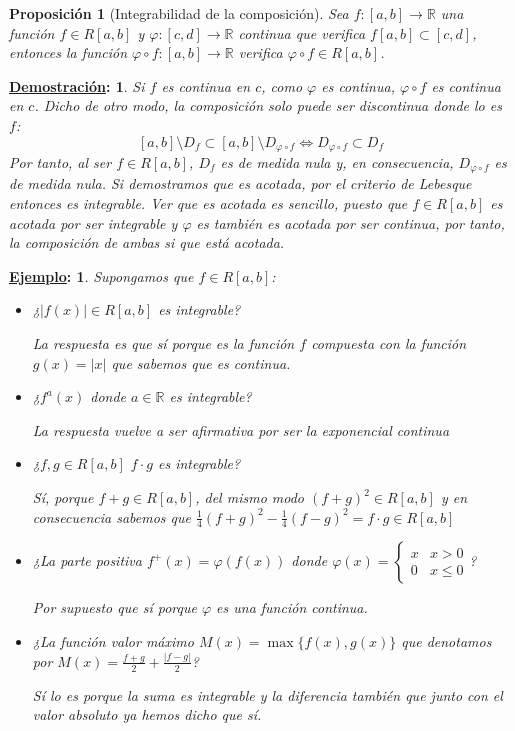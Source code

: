 \documentclass[10pt,a4paper,openright]{book}
\theoremstyle{break}
\newtheorem*{prop}{Proposición}
\newtheorem*{demo}{\underline{Demostración}:}
\newtheorem*{ej}{\underline{Ejemplo}:}
\begin{document}
\begin{prop}[Integrabilidad de la composición]
Sea $f:[a,b]\rightarrow \mathbb R$ una función $f\in R[a,b]$ y $\varphi: [c,d]\rightarrow \mathbb R$ continua que verifica $f[a,b]\subset[c,d]$, entonces la función $\varphi \circ f: [a,b]\rightarrow \mathbb R$ verifica $\varphi\circ f \in R[a,b]$.
\end{prop}
\begin{demo}
Si $f$ es continua en $c$, como $\varphi$ es continua, $\varphi\circ f$ es continua en $c$. Dicho de otro modo, la composición solo puede ser discontinua donde lo es $f$:
$$[a,b]\setminus D_f \subset [a,b]\setminus D_{\varphi \circ f} \Leftrightarrow D_{\varphi \circ f} \subset D_f$$
Por tanto, al ser $f\in R[a,b]$, $D_f$ es de medida nula y, en consecuencia, $D_{\varphi\circ f}$ es de medida nula. Si demostramos que es acotada, por el criterio de Lebesque entonces es integrable. Ver que es acotada es sencillo, puesto que $f\in R[a,b]$ es acotada  por ser integrable y $\varphi$ es también es acotada por ser continua, por tanto, la composición de ambas si que está acotada.
\end{demo}

\begin{ej}
Supongamos que $f\in R[a,b]$:
\begin{itemize}
\item ¿$|f(x)|\in R[a,b]$ es integrable?

La respuesta es que sí porque es la función $f$ compuesta con la función $g(x)=|x|$ que sabemos que es continua.

\item ¿$f^a(x)$ donde $a\in \mathbb R$ es integrable?

La respuesta vuelve a ser afirmativa por ser la exponencial continua

\item ¿$f,g\in R[a,b]$ $f\cdot g$ es integrable?

Sí, porque $f+g\in R[a,b]$, del mismo modo $(f+g)^2\in R[a,b]$ y en consecuencia sabemos que $\frac{1}{4}(f+g)^2-\frac{1}{4}(f-g)^2 = f\cdot g\in R[a,b]$

\item ¿La parte positiva $f^+(x)=\varphi(f(x))$ donde $\varphi(x)=\begin{cases} x & x>0 \\ 0 & x\leq 0\end{cases}$?

Por supuesto que sí porque $\varphi$ es una función continua.

\item ¿La función valor máximo $M(x)=\max\{f(x),g(x)\}$ que denotamos por $M(x)=\frac{f+g}{2}+\frac{|f-g|}{2}$?

Sí lo es porque la suma es integrable y la diferencia también que junto con el valor absoluto ya hemos dicho que sí.
\end{itemize}
\end{ej}
\end{document}
